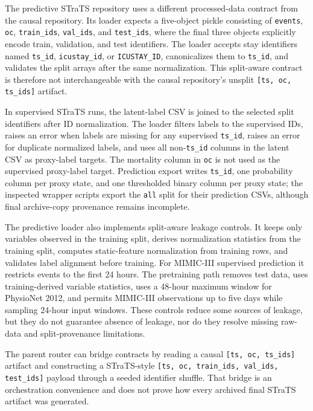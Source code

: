 The predictive STraTS repository uses a different processed-data contract from the causal repository.  Its loader expects a five-object pickle consisting of \texttt{events}, \texttt{oc}, \texttt{train\_ids}, \texttt{val\_ids}, and \texttt{test\_ids}, where the final three objects explicitly encode train, validation, and test identifiers.  The loader accepts stay identifiers named \texttt{ts\_id}, \texttt{icustay\_id}, or \texttt{ICUSTAY\_ID}, canonicalizes them to \texttt{ts\_id}, and validates the split arrays after the same normalization.  This split-aware contract is therefore not interchangeable with the causal repository's unsplit \texttt{[ts, oc, ts\_ids]} artifact.

In supervised STraTS runs, the latent-label CSV is joined to the selected split identifiers after ID normalization.  The loader filters labels to the supervised IDs, raises an error when labels are missing for any supervised \texttt{ts\_id}, raises an error for duplicate normalized labels, and uses all non-\texttt{ts\_id} columns in the latent CSV as proxy-label targets.  The mortality column in \texttt{oc} is not used as the supervised proxy-label target.  Prediction export writes \texttt{ts\_id}, one probability column per proxy state, and one thresholded binary column per proxy state; the inspected wrapper scripts export the \texttt{all} split for their prediction CSVs, although final archive-copy provenance remains incomplete.

The predictive loader also implements split-aware leakage controls.  It keeps only variables observed in the training split, derives normalization statistics from the training split, computes static-feature normalization from training rows, and validates label alignment before training.  For MIMIC-III supervised prediction it restricts events to the first 24 hours.  The pretraining path removes test data, uses training-derived variable statistics, uses a 48-hour maximum window for PhysioNet 2012, and permits MIMIC-III observations up to five days while sampling 24-hour input windows.  These controls reduce some sources of leakage, but they do not guarantee absence of leakage, nor do they resolve missing raw-data and split-provenance limitations.

The parent router can bridge contracts by reading a causal \texttt{[ts, oc, ts\_ids]} artifact and constructing a STraTS-style \texttt{[ts, oc, train\_ids, val\_ids, test\_ids]} payload through a seeded identifier shuffle.  That bridge is an orchestration convenience and does not prove how every archived final STraTS artifact was generated.

